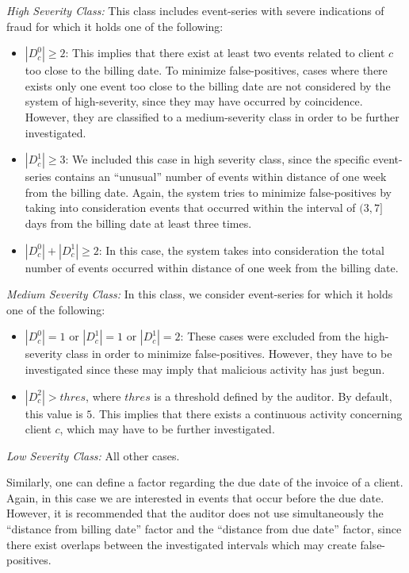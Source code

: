 \documentclass[conference]{IEEEtran}
\begin{document}
\emph{High Severity Class:} This class includes event-series with
severe indications of fraud for which it holds one of the following:
  \begin{itemize}
    \item $|D_c^0| \geq 2$: This implies that there
    exist at least two events related to client $c$ too close to the
    billing date. To minimize false-positives, cases where there exists only one event too close to
    the billing date are not considered by the system of high-severity, since they
    may have occurred by coincidence. However, they are classified
    to a medium-severity class in order to be further investigated.
    \item $|D_c^1| \geq 3$: We included this case in high severity class,
    since the specific event-series contains an ``unusual'' number of events within distance of one week from the billing date.
    Again, the system tries to minimize false-positives by taking into consideration events
    that occurred within the interval of $(3,7]$ days from the billing date at least three times.
    \item $|D_c^0| + |D_c^1| \geq 2$: In this case, the system takes into consideration the total number
    of events occurred within distance of one week from the billing
    date.
  \end{itemize}
\emph{ Medium Severity Class:} In this class, we consider
event-series for which it holds one of the following:
  \begin{itemize}
    \item $|D_c^0| = 1$ or $|D_c^1| = 1$ or $|D_c^1| = 2$: These cases were excluded from the
    high-severity class in order to minimize false-positives. However, they
    have to be investigated since these may imply that malicious activity has just begun.
    \item $|D_c^2| > thres$, where $thres$ is a threshold defined by the auditor. By default, this value is $5$. This implies that there exists a continuous activity
    concerning client $c$, which may have to be further investigated.
  \end{itemize}
\emph{Low Severity Class:} All other cases.


Similarly, one can define a factor regarding the due date of the
invoice of a client. Again, in this case we are interested in events
that occur before the due date. However, it is recommended that the
auditor does not use simultaneously the ``distance from billing
date'' factor and the ``distance from due date'' factor, since there
exist overlaps between the investigated intervals which may create
false-positives.
\end{document}
